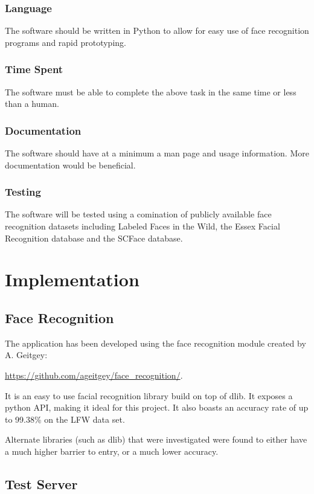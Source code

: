 \documentclass[12pt]{article}
\begin{document}
\subsubsection{Language}
The software should be written in Python to allow for easy use of face recognition programs and rapid prototyping.

\subsubsection{Time Spent}
The software must be able to complete the above task in the same time or less than a human.

\subsubsection{Documentation}
The software should have at a minimum a man page and usage information. More documentation would be beneficial.

\subsubsection{Testing}
The software will be tested using a comination of publicly available face recognition datasets including Labeled Faces in the Wild, the Essex Facial Recognition database and the SCFace database.

\newpage
\section{Implementation}
\subsection{Face Recognition}
The application has been developed using the face recognition module created by A. Geitgey:

\url{https://github.com/ageitgey/face\_recognition/}.

It is an easy to use facial recognition library build on top of dlib. It exposes a python API, making it ideal for this project. It also boasts an accuracy rate of up to 99.38\% on the LFW data set.

Alternate libraries (such as dlib) that were investigated were found to either have a much higher barrier to entry, or a much lower accuracy.

\subsection{Test Server}
\end{document}
